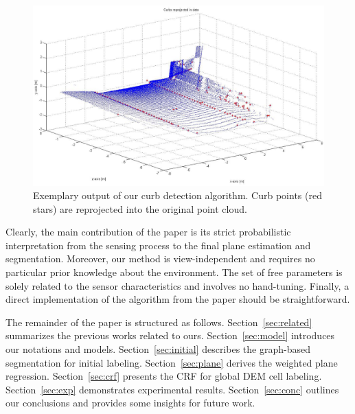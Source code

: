 \begin{figure}[t]
\centering
\includegraphics[width=\columnwidth]{fig/intro.eps}
\caption{Exemplary output of our curb detection algorithm. Curb points
(red stars) are reprojected into the original point cloud.}
\label{fig:intro}
\end{figure}

Clearly, the main contribution of the paper is its strict probabilistic
interpretation from the sensing process to the final plane estimation and
segmentation. Moreover, our method is view-independent and requires no
particular prior knowledge about the environment. The set of free parameters
is solely related to the sensor characteristics and involves no hand-tuning.
Finally, a direct implementation of the algorithm from the paper should be
straightforward.

The remainder of the paper is structured as follows. Section~\ref{sec:related}
summarizes the previous works related to ours. Section~\ref{sec:model}
introduces our notations and models. Section~\ref{sec:initial} describes the
graph-based segmentation for initial labeling. Section~\ref{sec:plane} derives
the weighted plane regression. Section~\ref{sec:crf} presents the CRF for
global DEM cell labeling. Section~\ref{sec:exp} demonstrates experimental
results. Section~\ref{sec:conc} outlines our conclusions and provides some
insights for future work.
